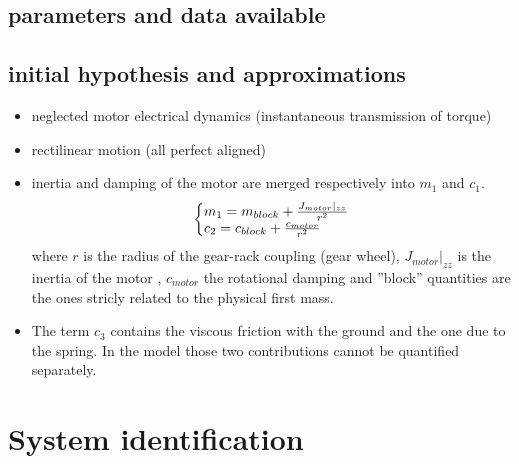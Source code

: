 \documentclass[twosided,a4paper]{article}           %
\makeatletter
\newenvironment{sistema}%
{\left\lbrace\begin{array}{@{}l@{}}}%
	{\end{array}\right.}
\makeatother
\begin{document}
	\subsection{parameters and data available}

\subsection{initial hypothesis and approximations}
\begin{itemize}
	\item neglected motor electrical dynamics (instantaneous transmission of torque)
	\item rectilinear motion (all perfect aligned)
	\item inertia and damping of the motor are merged respectively into $m_1$ and $c_1$.
	\begin{equation}
	\begin{sistema}
		m_1 = m_{block} + \frac{J_{motor}\vert_{zz}}{r^2}\\
		c_2 = c_{block} + \frac{c_{motor}}{r^2}
	\end{sistema}
	\end{equation}
	where $r$ is the radius of the gear-rack coupling (gear wheel), $J_{motor}\vert_{zz}$ is the inertia of the motor , $c_{motor}$ the rotational damping and ''block'' quantities are the ones stricly related to the physical first mass.
	\item The term $c_3$ contains the viscous friction with the ground and the one due to the spring. In the model those two contributions cannot be quantified separately.
	
\end{itemize}
\section{System identification}
	
\end{document}
